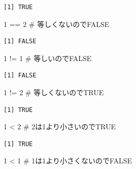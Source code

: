 \documentclass[
  letterpaper,
  DIV=11,
  numbers=noendperiod]{scrreprt}
\newenvironment{Shaded}{\begin{snugshade}}{\end{snugshade}}
\newcommand{\CommentTok}[1]{\textcolor[rgb]{0.37,0.37,0.37}{#1}}
\newcommand{\DecValTok}[1]{\textcolor[rgb]{0.68,0.00,0.00}{#1}}
\newcommand{\SpecialCharTok}[1]{\textcolor[rgb]{0.37,0.37,0.37}{#1}}
\begin{document}
\begin{verbatim}
[1] TRUE
\end{verbatim}

\begin{Shaded}
\begin{Highlighting}[]
\DecValTok{1} \SpecialCharTok{==} \DecValTok{2} \CommentTok{\# 等しくないのでFALSE}
\end{Highlighting}
\end{Shaded}

\begin{verbatim}
[1] FALSE
\end{verbatim}

\begin{Shaded}
\begin{Highlighting}[]
\DecValTok{1} \SpecialCharTok{!=} \DecValTok{1} \CommentTok{\# 等しいのでFALSE}
\end{Highlighting}
\end{Shaded}

\begin{verbatim}
[1] FALSE
\end{verbatim}

\begin{Shaded}
\begin{Highlighting}[]
\DecValTok{1} \SpecialCharTok{!=} \DecValTok{2} \CommentTok{\# 等しくないのでTRUE}
\end{Highlighting}
\end{Shaded}

\begin{verbatim}
[1] TRUE
\end{verbatim}

\begin{Shaded}
\begin{Highlighting}[]
\DecValTok{1} \SpecialCharTok{\textless{}} \DecValTok{2} \CommentTok{\# 2は1より小さいのでTRUE}
\end{Highlighting}
\end{Shaded}

\begin{verbatim}
[1] TRUE
\end{verbatim}

\begin{Shaded}
\begin{Highlighting}[]
\DecValTok{1} \SpecialCharTok{\textless{}} \DecValTok{1} \CommentTok{\# 1は1より小さくないのでFALSE}
\end{Highlighting}
\end{Shaded}
\end{document}

